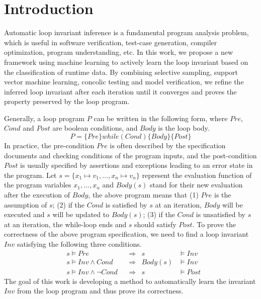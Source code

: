 
\section{Introduction} %
\label{sec:introduction}

Automatic loop invariant inference is a fundamental program analysis problem, 
which is useful in software verification, test-case generation, 
compiler optimization, program understanding, etc. 
In this work, we propose a new framework using machine learning 
to actively learn the loop invariant based on the classification of runtime data. 
By combining selective sampling, support vector machine learning, 
concolic testing and model verification, 
we refine the inferred loop invariant after each iteration 
until it converges and proves the property preserved by the loop program. 

Generally, a loop program $P$ can be written in the following form, 
where $\mathit{Pre}$, $\mathit{Cond}$ and $\mathit{Post}$ are boolean conditions, 
and $\mathit{Body}$ is the loop body. 
\[
    P = \{ \mathit{Pre} \} \mathit{while}(\mathit{Cond}) \{ \mathit{Body} \} \{ \mathit{Post} \}
\]
In practice, the pre-condition $\mathit{Pre}$ is often described by 
the specification documents and checking conditions of the program inputs, 
and the post-condition $\mathit{Post}$ is usually specified 
by assertions and exceptions leading to an error state in the program. 
Let $s = \{ x_1 \mapsto v_1, \ldots, x_n \mapsto v_n \}$ represent 
the evaluation function of the program variables $x_1, \ldots, x_n$
and $\mathit{Body}(s)$ stand for their new evaluation after the execution of $\mathit{Body}$, 
the above program means that (1) $\mathit{Pre}$ is the assumption of $s$; 
(2) if the $\mathit{Cond}$ is satisfied by $s$ at an iteration, 
$\mathit{Body}$ will be executed and $s$ will be updated to $\mathit{Body}(s)$; 
(3) if the $\mathit{Cond}$ is unsatisfied by $s$ at an iteration, 
the while-loop ends and $s$ should satisfy $\mathit{Post}$. 
To prove the correctness of the above program specification, 
we need to find a loop invariant $\mathit{Inv}$ satisfying the following three conditions. 
\begin{align}
    &s \models \mathit{Pre} 
        &&\Rightarrow & s &\models \mathit{Inv} \label{inv:pre} \\
    &s \models \mathit{Inv} \wedge \mathit{Cond} 
        &&\Rightarrow & \mathit{Body}(s) &\models \mathit{Inv} \label{inv:loop} \\
    &s \models \mathit{Inv} \wedge \neg\mathit{Cond} 
        &&\Rightarrow & s &\models \mathit{Post} \label{inv:post}
\end{align}
The goal of this work is developing a method to automatically learn 
the invariant $\mathit{Inv}$ from the loop program and thus prove its correctness. 


